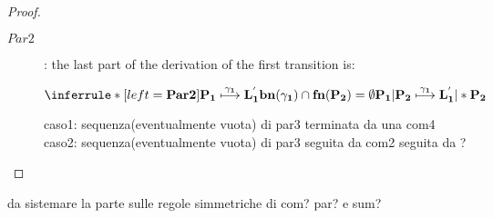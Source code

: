 \begin{proposition}
\begin{proof}
\begin{description}
\begin{description}
		\end{description}
	      \item[$Par2$]: 
		the last part of the derivation of the first transition is:
		\begin{center}
		  $\inferrule* [left=\bf{Par2}]{
		      P_{1} \stackrel{\gamma_{1}}{\longmapsto} L_{1}^{'}
		    \\
		      bn(\gamma_{1})\cap fn(P_{2})=\emptyset
		  }{
		    P_{1}|P_{2} \stackrel{\gamma_{1}}{\longmapsto} L_{1}^{'}|*P_{2}
		  }$ 		      
		\end{center}
		caso1: sequenza(eventualmente vuota) di par3 terminata da una com4
		caso2: sequenza(eventualmente vuota) di par3 seguita da com2 seguita da ?
	    \end{description}	    
  \end{proof}
\end{proposition}


da sistemare la parte sulle regole simmetriche di com? par? e sum?




